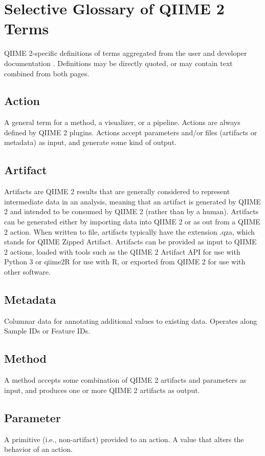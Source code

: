 \chapter{Selective Glossary of QIIME 2 Terms}
\label{app:glossary}

QIIME 2-specific definitions of terms aggregated from the user \parencite{qiime_2_development_team_glossary_2016}
and developer documentation \parencite{qiime_2_development_team_glossary_2018}.
Definitions may be directly quoted, or may contain text combined from both pages.

\section*{Action}
\noindent A general term for a method, a visualizer, or a pipeline. Actions are always
defined by QIIME 2 plugins. Actions accept parameters and/or files (artifacts or
metadata) as input, and generate some kind of output.

\section*{Artifact}
\noindent Artifacts are QIIME 2 results that are generally considered to represent
intermediate data in an analysis, meaning that an artifact is generated by QIIME
2 and intended to be consumed by QIIME 2 (rather than by a human). Artifacts can
be generated either by importing data into QIIME 2 or as out from a QIIME 2
action. When written to file, artifacts typically have the extension .qza, which
stands for QIIME Zipped Artifact. Artifacts can be provided as input to QIIME 2
actions, loaded with tools such as the QIIME 2 Artifact API for use with Python
3 or qiime2R for use with R, or exported from QIIME 2 for use with other
software.

\section*{Metadata}
\noindent Columnar data for annotating additional values to existing data. Operates along
Sample IDs or Feature IDs.

\section*{Method}
\noindent A method accepts some combination of QIIME 2 artifacts and parameters as input,
and produces one or more QIIME 2 artifacts as output.

\section*{Parameter}
\noindent A primitive (i.e., non-artifact) provided to an action. A value that alters the
behavior of an action.

